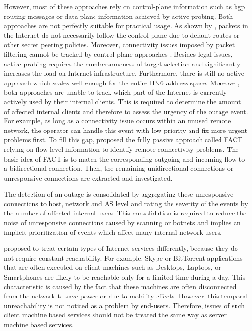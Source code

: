 However, most of these approaches rely on \gls{control-plane} information such as \gls{bgp} routing messages or \gls{data-plane} information achieved by active probing. Both approaches are not perfectly suitable for practical usage.
As shown by \citet{Bush:Optometry}, packets in the Internet do not necessarily follow the \gls{control-plane} due to default routes or other secret peering policies. Moreover, connectivity issues imposed by packet filtering cannot be tracked by \gls{control-plane} approaches \citep{Dainotti:2011:ACI}. Besides legal issues, active probing requires the cumbersomeness of target selection and significantly increases the load on Internet infrastructure. Furthermore, there is still no active approach which scales well enough for the entire \gls{IPv6} address space. Moreover, both approaches are unable to track which part of the Internet is currently actively used by their internal clients. This is required to determine the amount of affected internal clients and therefore to assess the urgency of the outage event. For example, as long as a connectivity issue occurs within an unused remote network, the operator can handle this event with low priority and fix more urgent problems first.
To fill this gap, \citet{SchatzmannPAM2011} proposed the fully passive approach called \gls{FACT} relying on flow-level information to identify remote connectivity problems. The basic idea of \gls{FACT} is to match the corresponding outgoing and incoming flow to a bidirectional connection. Then, the remaining unidirectional connections or unresponsive connections are extracted and investigated. 

The detection of an outage is consolidated by aggregating these unresponsive connections to host, network and \gls{AS} level and rating the severity of the events by the number of affected internal users. This consolidation is required to reduce the noise of unresponsive connections caused by scanning or botnets and implies an implicit prioritization of events which affect many internal network users.

\citet{SchatzmanThesis2012} proposed to treat certain types of Internet services differently, because they do not require constant reachability. For example, Skype or BitTorrent applications that are often executed on client machines such as Desktops, Laptops, or Smartphones are likely to be reachable only for a limited time during a day.
This characteristic is caused by the fact that these machines are often disconnected from the network to save power or due to mobility effects. However, this temporal unreachability is not noticed as a problem by end-users. 
Therefore, issues of such client machine based services should not be treated the same way as server machine based services.

